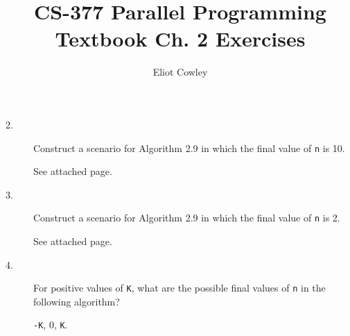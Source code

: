 \documentclass[]{article}
\title{CS-377 Parallel Programming\\
Textbook Ch. 2 Exercises}
\author{Eliot Cowley}
\begin{document}
\maketitle

\begin{description}

\item[2.] Construct a scenario for Algorithm 2.9 in which the final value of \texttt{n} is 10.

See attached page.

\item[3.] Construct a scenario for Algorithm 2.9 in which the final value of \texttt{n} is 2.

See attached page.

\item[4.] For positive values of \texttt{K}, what are the possible final values of \texttt{n} in the following algorithm?

\texttt{-K}, 0, \texttt{K}.

\end{description}
\end{document}

